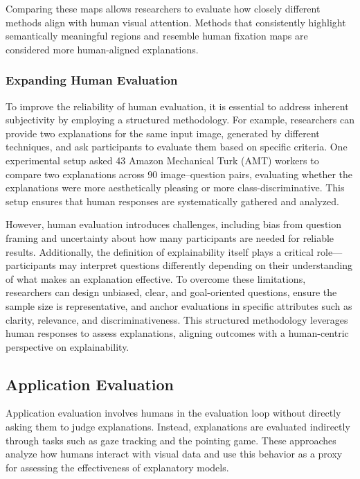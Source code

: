 \documentclass{article}
\begin{document}
Comparing these maps allows researchers to evaluate how closely different
methods align with human visual attention. Methods that consistently highlight
semantically meaningful regions and resemble human fixation maps are considered
more human-aligned explanations.

\subsubsection{Expanding Human Evaluation}

To improve the reliability of human evaluation, it is essential to address inherent subjectivity by employing a structured methodology. For example, researchers can provide two explanations for the same input image, generated by different techniques, and ask participants to evaluate them based on specific criteria. One experimental setup asked 43 Amazon Mechanical Turk (AMT) workers to compare two explanations across 90 image–question pairs, evaluating whether the explanations were more aesthetically pleasing or more class-discriminative. This setup ensures that human responses are systematically gathered and analyzed.

However, human evaluation introduces challenges, including bias from question framing and uncertainty about how many participants are needed for reliable results. Additionally, the definition of explainability itself plays a critical role—participants may interpret questions differently depending on their understanding of what makes an explanation effective. To overcome these limitations, researchers can design unbiased, clear, and goal-oriented questions, ensure the sample size is representative, and anchor evaluations in specific attributes such as clarity, relevance, and discriminativeness. This structured methodology leverages human responses to assess explanations, aligning outcomes with a human-centric perspective on explainability.

\subsection{Application Evaluation}

Application evaluation involves humans in the evaluation loop without 
directly asking them to judge explanations. Instead, explanations are 
evaluated indirectly through tasks such as gaze tracking and the 
pointing game. These approaches analyze how humans interact with visual 
data and use this behavior as a proxy for assessing the effectiveness of 
explanatory models.
\end{document}
